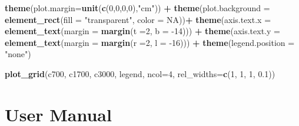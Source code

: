 \documentclass[12pt,oneside]{reedthesis}
\newenvironment{Shaded}{\begin{snugshade}}{\end{snugshade}}
\newcommand{\DataTypeTok}[1]{\textcolor[rgb]{0.13,0.29,0.53}{#1}}
\newcommand{\DecValTok}[1]{\textcolor[rgb]{0.00,0.00,0.81}{#1}}
\newcommand{\FloatTok}[1]{\textcolor[rgb]{0.00,0.00,0.81}{#1}}
\newcommand{\KeywordTok}[1]{\textcolor[rgb]{0.13,0.29,0.53}{\textbf{#1}}}
\newcommand{\NormalTok}[1]{#1}
\newcommand{\OperatorTok}[1]{\textcolor[rgb]{0.81,0.36,0.00}{\textbf{#1}}}
\newcommand{\OtherTok}[1]{\textcolor[rgb]{0.56,0.35,0.01}{#1}}
\newcommand{\StringTok}[1]{\textcolor[rgb]{0.31,0.60,0.02}{#1}}
\begin{document}
\begin{Shaded}
\begin{Highlighting}[]
\StringTok{  }\KeywordTok{theme}\NormalTok{(}\DataTypeTok{plot.margin=}\KeywordTok{unit}\NormalTok{(}\KeywordTok{c}\NormalTok{(}\DecValTok{0}\NormalTok{,}\DecValTok{0}\NormalTok{,}\DecValTok{0}\NormalTok{,}\DecValTok{0}\NormalTok{),}\StringTok{"cm"}\NormalTok{)) }\OperatorTok{+}
\StringTok{  }\KeywordTok{theme}\NormalTok{(}\DataTypeTok{plot.background =} \KeywordTok{element_rect}\NormalTok{(}\DataTypeTok{fill =} \StringTok{"transparent"}\NormalTok{, }\DataTypeTok{color =} \OtherTok{NA}\NormalTok{))}\OperatorTok{+}
\StringTok{  }\KeywordTok{theme}\NormalTok{(}\DataTypeTok{axis.text.x =} \KeywordTok{element_text}\NormalTok{(}\DataTypeTok{margin =}  \KeywordTok{margin}\NormalTok{(}\DataTypeTok{t =}\DecValTok{2}\NormalTok{, }\DataTypeTok{b =} \DecValTok{-14}\NormalTok{))) }\OperatorTok{+}\StringTok{ }
\StringTok{  }\KeywordTok{theme}\NormalTok{(}\DataTypeTok{axis.text.y =} \KeywordTok{element_text}\NormalTok{(}\DataTypeTok{margin =}  \KeywordTok{margin}\NormalTok{(}\DataTypeTok{r =}\DecValTok{2}\NormalTok{, }\DataTypeTok{l =} \DecValTok{-16}\NormalTok{))) }\OperatorTok{+}
\StringTok{  }\KeywordTok{theme}\NormalTok{(}\DataTypeTok{legend.position =} \StringTok{"none"}\NormalTok{)}

\KeywordTok{plot_grid}\NormalTok{(c700, c1700, c3000, legend, }\DataTypeTok{ncol=}\DecValTok{4}\NormalTok{, }\DataTypeTok{rel_widths=}\KeywordTok{c}\NormalTok{(}\DecValTok{1}\NormalTok{, }\DecValTok{1}\NormalTok{, }\DecValTok{1}\NormalTok{, }\FloatTok{0.1}\NormalTok{))}
\end{Highlighting}
\end{Shaded}
\normalsize

\hypertarget{manual}{%
\chapter{User Manual}\label{manual}}
\end{document}
